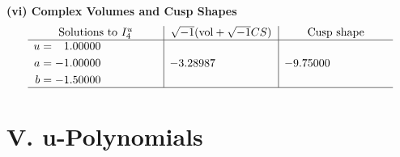 \documentclass[1p]{elsarticle_modified}
\theoremstyle{definition}
\newcommand{\I}{\sqrt{-1}}
\begin{document}
\newpage\flushleft \textbf{(vi) Complex Volumes and Cusp Shapes}
$$\begin{array}{c|c|c}  
\text{Solutions to }I^u_{4}& \I (\text{vol} + \sqrt{-1}CS) & \text{Cusp shape}\\
 \hline 
\begin{aligned}
u &= \phantom{-}1.00000\phantom{ +0.000000I} \\
a &= -1.00000\phantom{ +0.000000I} \\
b &= -1.50000\phantom{ +0.000000I}\end{aligned}
 & -3.28987\phantom{ +0.000000I} & -9.75000\phantom{ +0.000000I}\\
 \hline 
 \end{array}$$\newpage
\newpage\renewcommand{\arraystretch}{1}
\centering \section*{ V. u-Polynomials}
\end{document}
